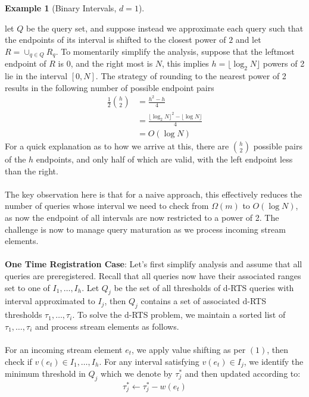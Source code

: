 \documentclass{article}
\newtheorem{example}{Example}
\begin{document}
\begin{example}[Binary Intervals, $d=1$] 
\end{example}
let $Q$ be the query set, and suppose instead we approximate each query such that the endpoints of its interval is shifted to the closest power of $2$ and let $R = \cup_{q\in Q}R_q$. To momentarily simplify the analysis, suppose that the leftmost endpoint of $R$ is 0, and the right most is $N$, this implies $h = \lfloor \log_2 N \rfloor$ powers of 2 lie in the interval $[0,N]$. The strategy of rounding to the nearest power of 2 results in the following number of possible endpoint pairs
\begin{align*}
    \frac{1}{2} {h\choose 2} &= \frac{h^2-h}{4} \\
    &= \frac{\lfloor\log_2 N\rfloor^2 - \lfloor\log N\rfloor}{4} \\
    &= O(\log N)
\end{align*}
For a quick explanation as to how we arrive at this, there are ${h\choose2}$ possible pairs of the $h$ endpoints, and only half of which are valid, with the left endpoint less than the right. \\
\\
The key observation here is that for a naive approach, this effectively reduces the number of queries whose interval we need to check from $\Omega(m)$ to $O(\log N)$, as now the endpoint of all intervals are now restricted to a power of 2. The challenge is now to manage query maturation as we process incoming stream elements. \\
\\
\textbf{One Time Registration Case}: Let's first simplify analysis and assume that all queries are preregistered. Recall that all queries now have their associated ranges set to one of $I_1, \dots, I_h$. Let $Q_j$ be the set of all thresholds of d-RTS queries with interval approximated to $I_j$, then $Q_j$ contains a set of associated d-RTS thresholds $\tau_1,\dots, \tau_i$. To solve the d-RTS problem, we maintain a sorted list of $\tau_1,\dots,\tau_i$ and process stream elements as follows.  \\
\\
For an incoming stream element $e_t$, we apply value shifting as per $(1)$, then check if $v(e_t) \in I_1, \dots, I_h$. For any interval satisfying $v(e_t)\in  I_j$, we identify the minimum threshold in $Q_j$ which we denote by $\tau_j^*$ and then updated according to: 
\begin{equation}
    \tau_j^* \leftarrow \tau_j^* - w(e_t)
\end{equation}
\end{document}
